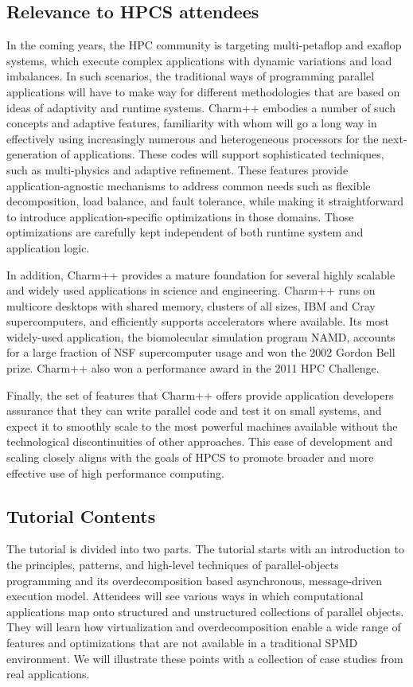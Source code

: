 \documentclass[letterpaper,10pt]{article}
\begin{document}
\subsection{Relevance to HPCS attendees}

In the coming years, the HPC community is targeting multi-petaflop and exaflop
systems, which execute complex applications with dynamic variations and load imbalances.
In such scenarios, the traditional ways of programming parallel applications will have to
make way for different methodologies that are based on ideas of adaptivity and runtime
systems.  Charm++ embodies a number of such concepts and adaptive features, familiarity
with whom will go a long way in effectively using increasingly numerous and heterogeneous
processors for the next-generation of applications. These codes will support sophisticated techniques, such as
multi-physics and adaptive refinement. These features provide
application-agnostic mechanisms to address common needs such as flexible
decomposition, load balance, and fault tolerance, while making it
straightforward to introduce application-specific optimizations in those
domains. Those optimizations are carefully kept independent of both runtime
system and application logic.

In addition, Charm++ provides a mature foundation for
several highly scalable and widely used applications in science and
engineering. Charm++ runs on multicore desktops with shared memory, clusters of
all sizes, IBM and Cray supercomputers, and efficiently supports accelerators
where available. Its most widely-used application, the biomolecular simulation
program NAMD, accounts for a large fraction of NSF supercomputer usage and won
the 2002 Gordon Bell prize. Charm++ also won a performance award in the
2011 HPC Challenge.

Finally, the set of features that Charm++ offers provide application developers
assurance that they can write parallel code and test it on small systems, and
expect it to smoothly scale to the most powerful machines available without the
technological discontinuities of other approaches. This ease of development and
scaling closely aligns with the goals of HPCS to promote broader
and more effective use of high performance computing.

\subsection{Tutorial Contents}

The tutorial is divided into two parts. The tutorial starts with an introduction to the principles, patterns,
and high-level techniques of parallel-objects programming and its overdecomposition
based asynchronous, message-driven execution model. Attendees will see various
ways in which computational applications map onto structured and unstructured collections of
parallel objects. They will learn how virtualization and overdecomposition
enable a wide range of features and optimizations that are not available in a
traditional SPMD environment. We will illustrate these points with a collection
of case studies from real applications.
\end{document}
